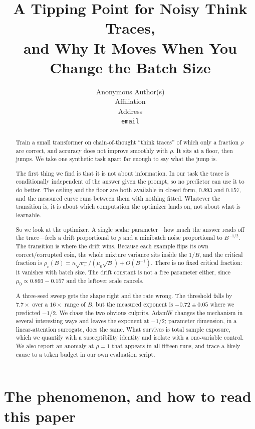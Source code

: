 \documentclass{article}
\title{A Tipping Point for Noisy Think Traces,\\
and Why It Moves When You Change the Batch Size}
\author{%
  Anonymous Author(s)\\
  Affiliation\\
  Address\\
  \texttt{email}
}
\theoremstyle{plain}
\theoremstyle{definition}
\theoremstyle{remark}
\newcommand{\1}{\mathbf{1}}
\begin{document}
\maketitle

\begin{abstract}
Train a small transformer on chain-of-thought ``think traces'' of which only a
fraction $\rho$ are correct, and accuracy does not improve smoothly with $\rho$.
It sits at a floor, then jumps. We take one synthetic task apart far enough to
say what the jump is.

The first thing we find is that it is not about information. In our task the
trace is conditionally independent of the answer given the prompt, so no
predictor can use it to do better. The ceiling and the floor are both available
in closed form, $0.893$ and $0.157$, and the measured curve runs between them
with nothing fitted. Whatever the transition is, it is about which computation
the optimizer lands on, not about what is learnable.

So we look at the optimizer. A single scalar parameter---how much the answer
reads off the trace---feels a drift proportional to $\rho$ and a minibatch noise
proportional to $B^{-1/2}$. The transition is where the drift wins. Because each
example flips its own correct/corrupted coin, the whole mixture variance sits
inside the $1/B$, and the critical fraction is $\rho_c(B)=\kappa\sqrt{v_+}/
(\mu_0\sqrt B)+O(B^{-1})$. There is no fixed critical fraction: it vanishes with
batch size. The drift constant is not a free parameter either, since
$\mu_0\propto 0.893-0.157$ and the leftover scale cancels.

A three-seed sweep gets the shape right and the rate wrong. The threshold falls
by $7.7\times$ over a $16\times$ range of $B$, but the measured exponent is
$-0.72\pm0.05$ where we predicted $-1/2$. We chase the two obvious culprits.
AdamW changes the mechanism in several interesting ways and leaves the exponent
at $-1/2$; parameter dimension, in a linear-attention surrogate, does the same.
What survives is total sample exposure, which we quantify with a susceptibility
identity and isolate with a one-variable control. We also report an anomaly at
$\rho=1$ that appears in all fifteen runs, and trace a likely cause to a token
budget in our own evaluation script.
\end{abstract}

\section{The phenomenon, and how to read this paper}
\label{sec:intro}
\end{document}
